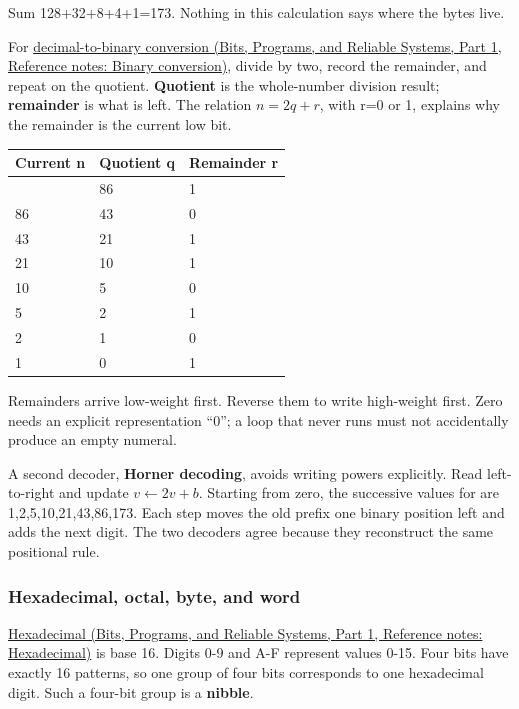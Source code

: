 Sum 128+32+8+4+1=173. Nothing in this calculation says where the bytes live.

For \href{../01-Bits-Programs-and-Reliable-Systems-P01/main.pdf\#appendix-dc552784a2c0}{decimal-to-binary conversion (Bits, Programs, and Reliable Systems, Part 1, Reference notes: Binary conversion)}, divide by two, record the remainder, and repeat on the quotient. \textbf{Quotient} is the whole-number division result; \textbf{remainder} is what is left. The relation \(n=2q+r\), with r=0 or 1, explains why the remainder is the current low bit.

{\def\LTcaptype{none} %
\begin{longtable}[]{@{}lll@{}}
\toprule\noalign{}
Current n & Quotient q & Remainder r \\
\midrule\noalign{}
\endhead
\bottomrule\noalign{}
\endlastfoot
173 & 86 & 1 \\
86 & 43 & 0 \\
43 & 21 & 1 \\
21 & 10 & 1 \\
10 & 5 & 0 \\
5 & 2 & 1 \\
2 & 1 & 0 \\
1 & 0 & 1 \\
\end{longtable}
}

Remainders arrive low-weight first. Reverse them to write  high-weight first. Zero needs an explicit representation ``0''; a loop that never runs must not accidentally produce an empty numeral.

A second decoder, \textbf{Horner decoding}, avoids writing powers explicitly. Read left-to-right and update \(v\leftarrow2v+b\). Starting from zero, the successive values for  are 1,2,5,10,21,43,86,173. Each step moves the old prefix one binary position left and adds the next digit. The two decoders agree because they reconstruct the same positional rule.

\subsubsection{Hexadecimal, octal, byte, and word}\label{05-engine-i-ch001-hexadecimal-octal-byte-and-word}

\hypertarget{05-engine-i-ch001-hexadecimal-octal-byte-and-word}{}

\href{../01-Bits-Programs-and-Reliable-Systems-P01/main.pdf\#appendix-6b8075763724}{Hexadecimal (Bits, Programs, and Reliable Systems, Part 1, Reference notes: Hexadecimal)} is base 16. Digits 0-9 and A-F represent values 0-15. Four bits have exactly 16 patterns, so one group of four bits corresponds to one hexadecimal digit. Such a four-bit group is a \textbf{nibble}.

